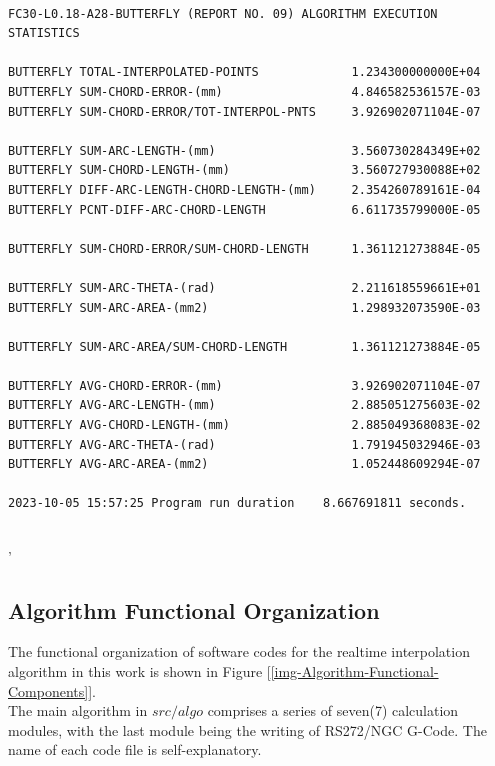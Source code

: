 \begin{lstlisting}[caption={Snippet of Butterfly Algorithm Summary Output}, label=snp-Butterfly Algorithm Summary Output]	
	
FC30-L0.18-A28-BUTTERFLY (REPORT NO. 09) ALGORITHM EXECUTION STATISTICS 		
	
BUTTERFLY TOTAL-INTERPOLATED-POINTS          	1.234300000000E+04	
BUTTERFLY SUM-CHORD-ERROR-(mm)               	4.846582536157E-03	
BUTTERFLY SUM-CHORD-ERROR/TOT-INTERPOL-PNTS  	3.926902071104E-07	
	
BUTTERFLY SUM-ARC-LENGTH-(mm)                	3.560730284349E+02	
BUTTERFLY SUM-CHORD-LENGTH-(mm)              	3.560727930088E+02	
BUTTERFLY DIFF-ARC-LENGTH-CHORD-LENGTH-(mm)  	2.354260789161E-04	
BUTTERFLY PCNT-DIFF-ARC-CHORD-LENGTH         	6.611735799000E-05	
	
BUTTERFLY SUM-CHORD-ERROR/SUM-CHORD-LENGTH   	1.361121273884E-05	
	
BUTTERFLY SUM-ARC-THETA-(rad)                	2.211618559661E+01	
BUTTERFLY SUM-ARC-AREA-(mm2)                 	1.298932073590E-03	
	
BUTTERFLY SUM-ARC-AREA/SUM-CHORD-LENGTH      	1.361121273884E-05	
	
BUTTERFLY AVG-CHORD-ERROR-(mm)               	3.926902071104E-07	
BUTTERFLY AVG-ARC-LENGTH-(mm)                	2.885051275603E-02	
BUTTERFLY AVG-CHORD-LENGTH-(mm)              	2.885049368083E-02	
BUTTERFLY AVG-ARC-THETA-(rad)                	1.791945032946E-03	
BUTTERFLY AVG-ARC-AREA-(mm2)                 	1.052448609294E-07	
	
2023-10-05 15:57:25	Program run duration    8.667691811 seconds. 
	
\end{lstlisting}

\clearpage
\pagebreak'
\subsection{Algorithm Functional Organization}


The functional organization of software codes for the realtime interpolation algorithm in this work is shown in Figure [\ref{img-Algorithm-Functional-Components}]. \\

The main algorithm in $src/algo$ comprises a series of seven(7) calculation modules, with the last module being the writing of RS272/NGC G-Code. The name of each code file is self-explanatory.\\

